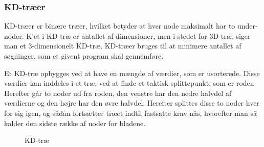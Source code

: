 \subsubsection{KD-træer}
\label{sec:kdtree}

KD-træer er binære træer, hvilket betyder at hver node maksimalt har to under-noder. K'et i KD-træ er antallet af dimensioner, men i stedet for 3D træ, siger man et 3-dimensionelt KD-træ. KD-træer bruges til at minimere antallet af søgninger, som et givent program skal gennemføre. 

Et KD-træ opbygges ved at have en mængde af værdier, som er usorterede. Disse værdier kan inddeles i et træ, ved at finde et taktisk splittepunkt, som er roden. Herefter går to noder ud fra roden, den venstre har den nedre halvdel af værdierne og den højre har den øvre halvdel. Herefter splittes disse to noder hver for sig igen, og sådan fortsætter træet indtil fastsatte krav nås, hvorefter man så kalder den sidste række af noder for bladene. 

\begin{figure}[H]
  \centering
  \caption{KD-træ}
  \label{fig:kd-tree}
\end{figure}

